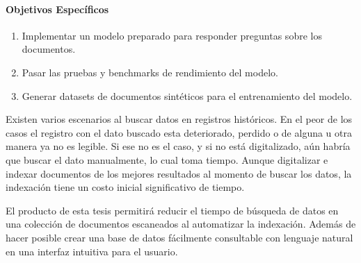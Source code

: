 \documentclass[../main.tex]{subfiles}
\begin{document}
\paragraph{Objetivos Específicos}

\begin{enumerate}
    \item Implementar un modelo preparado para responder preguntas sobre los documentos.
    \item Pasar las pruebas y benchmarks de rendimiento del modelo.
    \item Generar datasets de documentos sintéticos para el entrenamiento del modelo.
\end{enumerate}

%


Existen varios escenarios al buscar datos en registros históricos.
En el peor de los casos el registro con el dato buscado esta deteriorado, perdido o de alguna u otra manera ya no es legible.
Si ese no es el caso, y si no está digitalizado, aún habría que buscar el dato manualmente, lo cual toma tiempo.
Aunque digitalizar e indexar documentos de los mejores resultados al momento de buscar los datos, la indexación 
tiene un costo inicial significativo de tiempo.

El producto de esta tesis permitirá reducir el tiempo de búsqueda de datos en una
colección de documentos escaneados al automatizar la indexación.
Además de hacer posible crear una base de datos fácilmente consultable con lenguaje natural en una interfaz intuitiva para el usuario.
\end{document}
